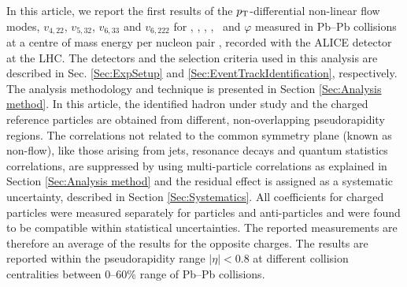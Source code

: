In this article, we report the first results of the $p_{\rm{T}}$-differential non-linear flow modes, $v_{4,22}$, $v_{5,32}$, $v_{6,33}$ and $v_{6,222}$ for \pion, \kaon, \proton, \Ks, \lambdas~and $\varphi$ measured in Pb--Pb collisions at a centre of mass energy per nucleon pair \sNN, recorded with the ALICE detector \cite{Aamodt:2008zz} at the LHC. The detectors and the selection criteria used in  this analysis are described in Sec. \ref{Sec:ExpSetup} and \ref{Sec:EventTrackIdentification}, respectively. %
The analysis methodology and technique is presented in Section \ref{Sec:Analysis method}. In this article, the identified hadron under study and the charged reference particles are obtained from different, non-overlapping pseudorapidity regions. The correlations not related to the common symmetry plane (known as non-flow), like those arising from jets, resonance decays and quantum statistics correlations, are suppressed by using multi-particle correlations as explained in Section \ref{Sec:Analysis method} and the residual effect is assigned as a systematic uncertainty, described in Section \ref{Sec:Systematics}. All coefficients for charged particles were measured separately for particles and anti-particles and were found to be compatible within statistical uncertainties. The reported measurements are therefore an average of the results for the opposite charges. The results are reported within the pseudorapidity range $|\eta|<0.8$ at different collision centralities between 0--60\% range of Pb--Pb collisions. 





